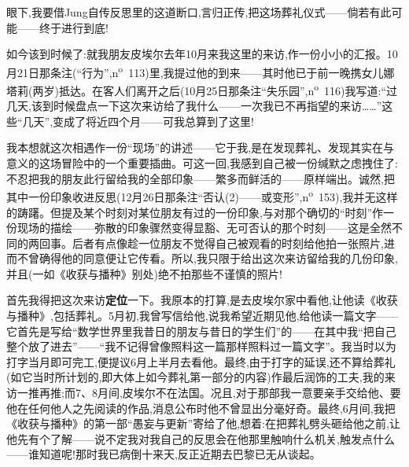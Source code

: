 眼下,我要借Jung自传反思里的这道断口,言归正传,把这场葬礼仪式——倘若有此可能——终于进行到底!

如今该到时候了:就我朋友皮埃尔去年10月来我这里的来访,作一份小小的汇报。10月21日那条注(“行为”,n\textsuperscript{o}~113)里,我提过他的到来——其时他已于前一晚携女儿娜塔莉(两岁)抵达。在客人们离开之后(10月25日那条注“失乐园”,n\textsuperscript{o}~116)我写道:“过几天,该到时候盘点一下这次来访给了我什么——一次我已不再指望的来访……”这些“几天”,变成了将近四个月——可我总算到了这里!

我本想就这次相遇作一份“现场”的讲述——它于我,是在发现葬礼、发现其实在与意义的这场冒险中的一个重要插曲。可这一回,我感到自己被一份缄默之虑拽住了:不忍把我的朋友此行留给我的全部印象——繁多而鲜活的——原样端出。诚然,把其中一份印象收进反思(12月26日那条注“否认(2)——或变形”,n\textsuperscript{o}~153),我并无这样的踌躇。但提及某个时刻对某位朋友有过的一份印象,与对那个确切的“时刻”作一份现场的描绘——弥散的印象骤然变得显豁、无可否认的那个时刻——这是全然不同的两回事。后者有点像趁一位朋友不觉得自己被观看的时刻给他拍一张照片,进而不曾确得他的同意便\dmark{}让它传看。所以,我只限于给出这次来访留给我的几份印象,并且(一如《收获与播种》别处)绝不拍那些不谨慎的照片!

首先我得把这次来访\textbf{定位}一下。我原本的打算,是去皮埃尔家中看他,让他读《收获与播种》,包括葬礼。5月初,我曾写信给他,说我希望近期见他,给他读一篇文字——它首先是写给“数学世界里我昔日的朋友与昔日的学生们”的——在其中我“把自己整个放了进去”——“我不记得曾像照料这一篇那样照料过一篇文字”。我当时以为打字当月即可完工,便提议6月上半月去看他。最终,由于打字的延误,还不算给葬礼(如它当时所计划的,即大体上如今葬礼第一部分的内容)作最后润饰的工夫,我的来访一推再推;而7、8月间,皮埃尔不在法国。况且,对于那部我一意要亲手交给他、要他在任何他人之先阅读的作品,消息公布时他不曾显出分毫好奇。最终,6月间,我把《收获与播种》的第一部“愚妄与更新”寄给了他,想着:在把葬礼劈头砸给他之前,让他先有个了解——说不定我对我自己的反思会在他那里触响什么机关,触发点什么——谁知道呢!那时我已病倒十来天,反正近期去巴黎已无从谈起。

